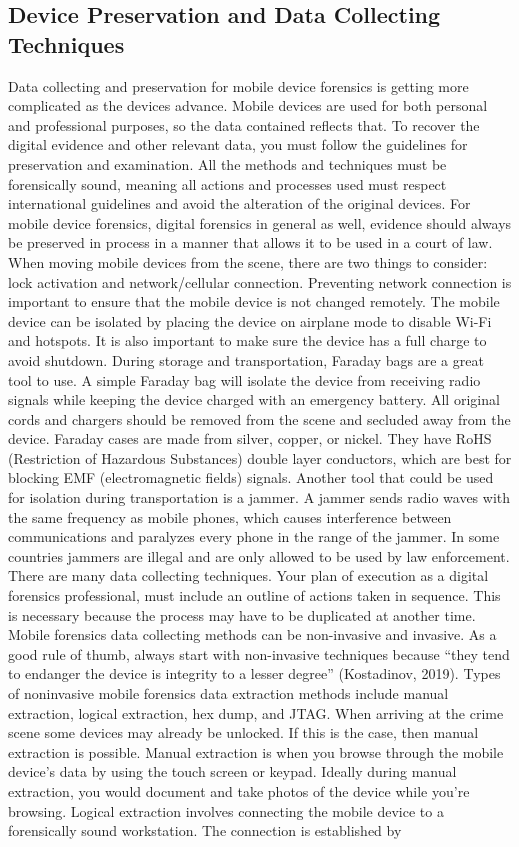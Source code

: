 \documentclass[acmlarge]{style/acmart}
\begin{document}
\subsection{Device Preservation and Data Collecting Techniques}
Data collecting and preservation for mobile device forensics is getting more complicated as the devices advance.  Mobile devices are used for both personal and professional purposes, so the data contained reflects that.  To recover the digital evidence and other relevant data, you must follow the guidelines for preservation and examination.  All the methods and techniques must be forensically sound, meaning all actions and processes used must respect international guidelines and avoid the alteration of the original devices.  For mobile device forensics, digital forensics in general as well, evidence should always be preserved in process in a manner that allows it to be used in a court of law.  When moving mobile devices from the scene, there are two things to consider: lock activation and network/cellular connection.  Preventing network connection is important to ensure that the mobile device is not changed remotely.  The mobile device can be isolated by placing the device on airplane mode to disable Wi-Fi and hotspots.  It is also important to make sure the device has a full charge to avoid shutdown.  During storage and transportation, Faraday bags are a great tool to use.  A simple Faraday bag will isolate the device from receiving radio signals while keeping the device charged with an emergency battery.  All original cords and chargers should be removed from the scene and secluded away from the device.  Faraday cases are made from silver, copper, or nickel.  They have RoHS (Restriction of Hazardous Substances) double layer conductors, which are best for blocking EMF (electromagnetic fields) signals.  Another tool that could be used for isolation during transportation is a jammer.  A jammer sends radio waves with the same frequency as mobile phones, which causes interference between communications and paralyzes every phone in the range of the jammer.  In some countries jammers are illegal and are only allowed to be used by law enforcement.  There are many data collecting techniques.  Your plan of execution as a digital forensics professional, must include an outline of actions taken in sequence.  This is necessary because the process may have to be duplicated at another time.  Mobile forensics data collecting methods can be non-invasive and invasive.  As a good rule of thumb, always start with non-invasive techniques because “they tend to endanger the device is integrity to a lesser degree” (Kostadinov, 2019).  Types of noninvasive mobile forensics data extraction methods include manual extraction, logical extraction, hex dump, and JTAG.  When arriving at the crime scene some devices may already be unlocked.  If this is the case, then manual extraction is possible.  Manual extraction is when you browse through the mobile device’s data by using the touch screen or keypad.  Ideally during manual extraction, you would document and take photos of the device while you're browsing.  Logical extraction involves connecting the mobile device to a forensically sound workstation.  The connection is established by 
\end{document}
